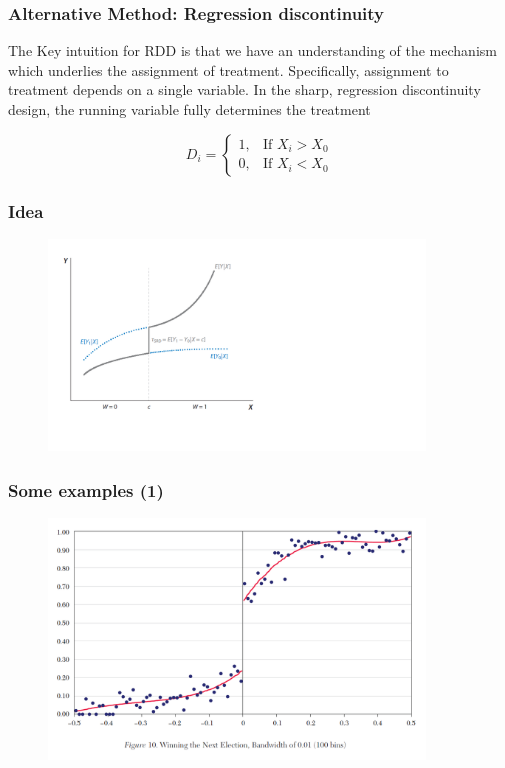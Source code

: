 \documentclass{beamer}
\newcommand{\1}{\mathbb{1}}
\begin{document}
\begin{frame}\frametitle{Alternative Method: Regression discontinuity}
The Key intuition for RDD is that we have an understanding of the mechanism which underlies the assignment of treatment. Specifically, assignment to treatment depends on a single variable. In the sharp, regression discontinuity design, the running variable fully determines the treatment

\begin{equation}
D_i = \begin{cases} 1, & \mbox{If } X_i > X_0 \\ 0, & \mbox{If } X_i < X_0 \end{cases}
\end{equation}
\end{frame}

\begin{frame}\frametitle{Idea}
\begin{figure}
\includegraphics[width = 10cm]{plot/Idea}
\end{figure}
\end{frame}


\begin{frame}\frametitle{Some examples (1)}
\begin{figure}
\includegraphics[width = 10cm]{plot/ProbWinning}
\end{figure}
\end{frame}
\end{document}
